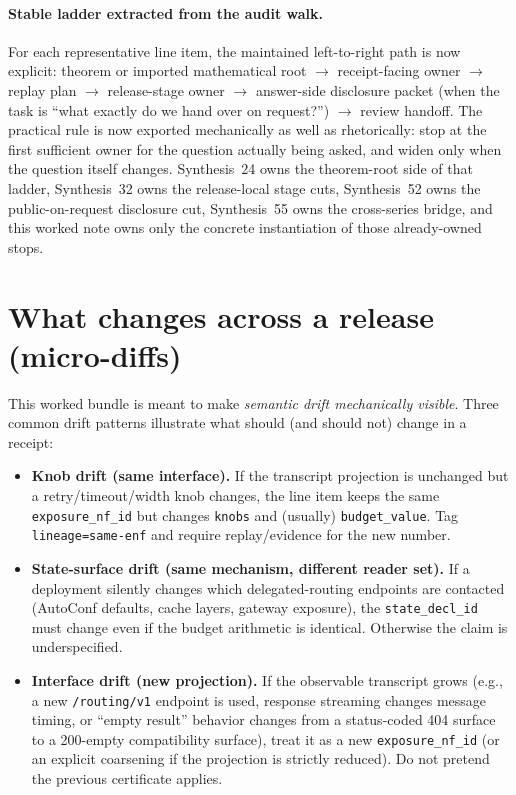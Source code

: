 \documentclass[11pt]{article}
\begin{document}
\paragraph{Stable ladder extracted from the audit walk.}
For each representative line item, the maintained left-to-right path is now explicit: theorem or imported mathematical root $\to$ receipt-facing owner $\to$ replay plan $\to$ release-stage owner $\to$ answer-side disclosure packet (when the task is ``what exactly do we hand over on request?'') $\to$ review handoff.
The practical rule is now exported mechanically as well as rhetorically: stop at the first sufficient owner for the question actually being asked, and widen only when the question itself changes.
Synthesis~24 owns the theorem-root side of that ladder, Synthesis~32 owns the release-local stage cuts, Synthesis~52 owns the public-on-request disclosure cut, Synthesis~55 owns the cross-series bridge, and this worked note owns only the concrete instantiation of those already-owned stops.\cite{series:mathcrosswalk,series:releasespine,series:challengeanswerdisclosurepackets,series:seriesspines}
\section{What changes across a release (micro-diffs)}

This worked bundle is meant to make \emph{semantic drift mechanically visible}.
Three common drift patterns illustrate what should (and should not) change in a receipt:

\begin{itemize}[leftmargin=*]
\item \textbf{Knob drift (same interface).} If the transcript projection is unchanged but a retry/timeout/width knob changes, the line item keeps the same \texttt{exposure\_nf\_id} but changes \texttt{knobs} and (usually) \texttt{budget\_value}. Tag \texttt{lineage=same-enf} and require replay/evidence for the new number.\cite{series:receiptitems,series:planstateequiv}
\item \textbf{State-surface drift (same mechanism, different reader set).} If a deployment silently changes which delegated-routing endpoints are contacted (AutoConf defaults, cache layers, gateway exposure), the \texttt{state\_decl\_id} must change even if the budget arithmetic is identical. Otherwise the claim is underspecified.\cite{series:deployedsurfaces,series:planstateequiv}
\item \textbf{Interface drift (new projection).} If the observable transcript grows (e.g., a new \texttt{/routing/v1} endpoint is used, response streaming changes message timing, or ``empty result'' behavior changes from a status-coded 404 surface to a 200-empty compatibility surface), treat it as a new \texttt{exposure\_nf\_id} (or an explicit coarsening if the projection is strictly reduced). Do not pretend the previous certificate applies.\cite{series:traceifaces,series:receiptitems,series:deployedsurfaces}
\end{itemize}
\end{document}
